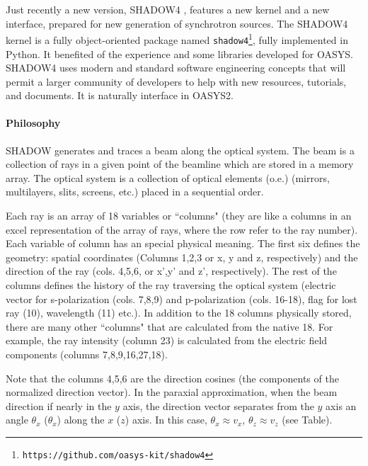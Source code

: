Just recently a new version, SHADOW4 \cite{shadow4_sri2025}, features a new kernel and a new interface, prepared for new generation of synchrotron sources.
The SHADOW4 kernel is a fully object-oriented package named {\tt shadow4}\footnote{{\tt https://github.com/oasys-kit/shadow4}}, fully implemented in Python. It benefited of the experience and some libraries developed for OASYS.
SHADOW4 uses modern and standard software engineering concepts that will permit a larger community of developers to help with new resources, tutorials, and documents.
It is naturally interface in OASYS2. 



\paragraph{Philosophy}

SHADOW generates and traces a beam along the optical system. The beam is a collection of rays in a given point of the beamline which are stored in a memory array. The optical system is a collection of optical elements (o.e.) (mirrors, multilayers, slits, screens, etc.) placed in a sequential order. 

Each ray is an array of 18 variables or ``columns" (they are like a columns in an excel representation of the array of rays, where the row refer to the ray number).
Each variable of column has an special physical meaning. The first six defines the geometry: spatial coordinates (Columns 1,2,3 or x, y and z, respectively) and the direction of the ray (cols. 4,5,6, or x’,y’ and z’, respectively). The rest of the columns defines the history of the ray traversing the optical system (electric vector for s-polarization (cols. 7,8,9) and p-polarization (cols. 16-18), flag for lost ray (10), wavelength (11) etc.).
In addition to the 18 columns physically stored, there are many other ``columns" that are calculated from the native 18. For example, the ray intensity (column 23) is calculated from the electric field components (columns 7,8,9,16,27,18).

Note that the columns 4,5,6 are the direction cosines (the components of the normalized direction vector). In the paraxial approximation, when the beam direction if nearly in the $y$ axis, the direction vector separates from the $y$ axis an angle $\theta_x$ ($\theta_x$) along the $x$ ($z$) axis. In this case, $\theta_x \approx v_x$, $\theta_z \approx v_z$ (see Table).

